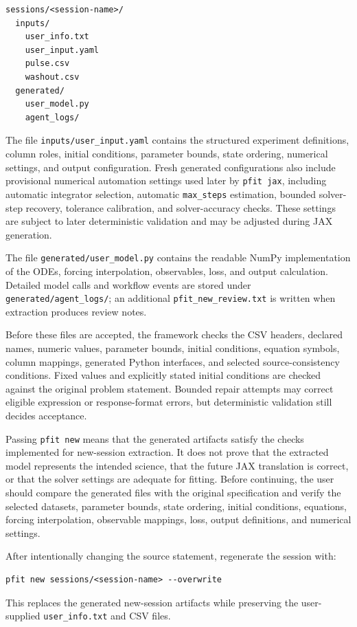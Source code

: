 \begin{verbatim}
sessions/<session-name>/
  inputs/
    user_info.txt
    user_input.yaml
    pulse.csv
    washout.csv
  generated/
    user_model.py
    agent_logs/
\end{verbatim}

The file \texttt{inputs/user\_input.yaml} contains the structured experiment
definitions, column roles, initial conditions, parameter bounds, state ordering,
numerical settings, and output configuration. Fresh generated configurations
also include provisional numerical automation settings used later by
\texttt{pfit jax}, including automatic integrator selection, automatic
\texttt{max\_steps} estimation, bounded solver-step recovery, tolerance
calibration, and solver-accuracy checks. These settings are subject to later
deterministic validation and may be adjusted during JAX generation.

The file \texttt{generated/user\_model.py} contains the readable NumPy
implementation of the ODEs, forcing interpolation, observables, loss, and output
calculation. Detailed model calls and workflow events are stored under
\texttt{generated/agent\_logs/}; an additional
\texttt{pfit\_new\_review.txt} is written when extraction produces review notes.

Before these files are accepted, the framework checks the CSV headers, declared
names, numeric values, parameter bounds, initial conditions, equation symbols,
column mappings, generated Python interfaces, and selected source-consistency
conditions. Fixed values and explicitly stated initial conditions are checked
against the original problem statement. Bounded repair attempts may correct
eligible expression or response-format errors, but deterministic validation
still decides acceptance.

Passing \texttt{pfit new} means that the generated artifacts satisfy the checks
implemented for new-session extraction. It does not prove that the extracted
model represents the intended science, that the future JAX translation is
correct, or that the solver settings are adequate for fitting. Before
continuing, the user should compare the generated files with the original
specification and verify the selected datasets, parameter bounds, state
ordering, initial conditions, equations, forcing interpolation, observable
mappings, loss, output definitions, and numerical settings.

After intentionally changing the source statement, regenerate the session with:

\begin{verbatim}
pfit new sessions/<session-name> --overwrite
\end{verbatim}

This replaces the generated new-session artifacts while preserving the
user-supplied \texttt{user\_info.txt} and CSV files.
